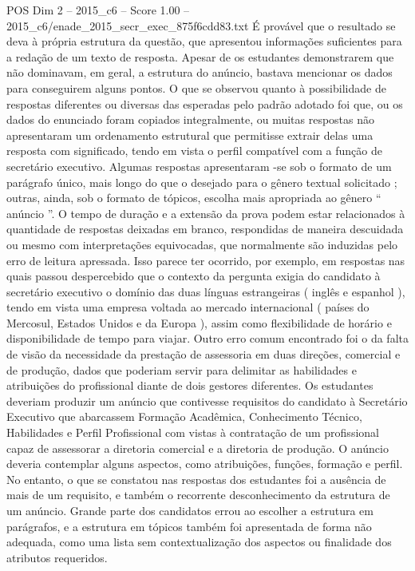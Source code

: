 \begin{textsample}{POS Dim 2 – 2015\_c6 – Score 1.00 – 2015\_c6/enade\_2015\_secr\_exec\_875f6cdd83.txt}
É provável que o resultado se deva à própria estrutura da questão, que apresentou informações suficientes para a redação de um texto de resposta.
Apesar de os estudantes demonstrarem que não dominavam, em geral, a estrutura do anúncio, bastava mencionar os dados para conseguirem alguns pontos.
O que se observou quanto à possibilidade de respostas diferentes ou diversas das esperadas pelo padrão adotado foi que, ou os dados do enunciado foram copiados integralmente, ou muitas respostas não apresentaram um ordenamento estrutural que permitisse extrair delas uma resposta com significado, tendo em vista o perfil compatível com a função de secretário executivo.
Algumas respostas apresentaram -se sob o formato de um parágrafo único, mais longo do que o desejado para o gênero textual solicitado ; outras, ainda, sob o formato de tópicos, escolha mais apropriada ao gênero “ anúncio ”.
O tempo de duração e a extensão da prova podem estar relacionados à quantidade de respostas deixadas em branco, respondidas de maneira descuidada ou mesmo com interpretações equivocadas, que normalmente são induzidas pelo erro de leitura apressada.
Isso parece ter ocorrido, por exemplo, em respostas nas quais passou despercebido que o contexto da pergunta exigia do candidato à secretário executivo o domínio das duas línguas estrangeiras ( inglês e espanhol ), tendo em vista uma empresa voltada ao mercado internacional ( países do Mercosul, Estados Unidos e da Europa ), assim como flexibilidade de horário e disponibilidade de tempo para viajar.
Outro erro comum encontrado foi o da falta de visão da necessidade da prestação de assessoria em duas direções, comercial e de produção, dados que poderiam servir para delimitar as habilidades e atribuições do profissional diante de dois gestores diferentes.
Os estudantes deveriam produzir um anúncio que contivesse requisitos do candidato à Secretário Executivo que abarcassem Formação Acadêmica, Conhecimento Técnico, Habilidades e Perfil Profissional com vistas à contratação de um profissional capaz de assessorar a diretoria comercial e a diretoria de produção.
O anúncio deveria contemplar alguns aspectos, como atribuições, funções, formação e perfil.
No entanto, o que se constatou nas respostas dos estudantes foi a ausência de mais de um requisito, e também o recorrente desconhecimento da estrutura de um anúncio.
Grande parte dos candidatos errou ao escolher a estrutura em parágrafos, e a estrutura em tópicos também foi apresentada de forma não adequada, como uma lista sem contextualização dos aspectos ou finalidade dos atributos requeridos.

\end{textsample}
